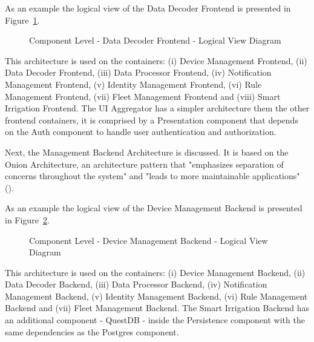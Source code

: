 As an example the logical view of the Data Decoder Frontend is presented in Figure~\ref{fig:design:architecture:component:logical:diagram:decoder}.

\begin{figure}[H]
   \centering
   \resizebox{\columnwidth}{!}
   {
      
   }
   \caption[Component Level - Data Decoder Frontend - Logical View Diagram]{Component Level - Data Decoder Frontend - Logical View Diagram}
   \label{fig:design:architecture:component:logical:diagram:decoder}
\end{figure}

This architecture is used on the containers: (i) Device Management Frontend, (ii) Data Decoder Frontend, (iii) Data Processor Frontend, (iv) Notification Management Frontend, (v) Identity Management Frontend, (vi) Rule Management Frontend, (vii) Fleet Management Frontend and (viii) Smart Irrigation Frontend. The UI Aggregator has a simpler architecture them the other frontend containers, it is comprised by a Presentation component that depends on the Auth component to handle user authentication and authorization.

Next, the Management Backend Architecture is discussed. It is based on the Onion Architecture, an architecture pattern that "emphasizes separation of concerns throughout the system" and "leads to more maintainable applications" (\cite{onion}).

As an example the logical view of the Device Management Backend is presented in Figure~\ref{fig:design:architecture:component:logical:diagram:device}.

\begin{figure}[H]
   \centering
   \resizebox{\columnwidth}{!}
   {
      
   }
   \caption[Component Level - Device Management Backend - Logical View Diagram]{Component Level - Device Management Backend - Logical View Diagram}
   \label{fig:design:architecture:component:logical:diagram:device}
\end{figure}

This architecture is used on the containers: (i) Device Management Backend, (ii) Data Decoder Backend, (iii) Data Processor Backend, (iv) Notification Management Backend, (v) Identity Management Backend, (vi) Rule Management Backend and (vii) Fleet Management Backend. The Smart Irrigation Backend has an additional component - QuestDB - inside the Persistence component with the same dependencies as the Postgres component.

